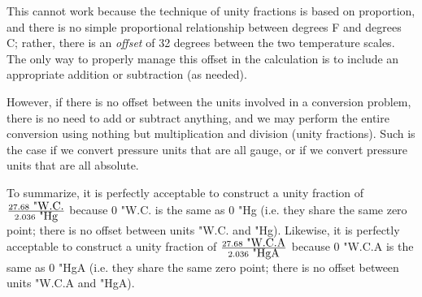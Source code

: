 This cannot work because the technique of unity fractions is based on proportion, and there is no simple proportional relationship between degrees F and degrees C; rather, there is an {\it offset} of 32 degrees between the two temperature scales.  The only way to properly manage this offset in the calculation is to include an appropriate addition or subtraction (as needed).

However, if there is no offset between the units involved in a conversion problem, there is no need to add or subtract anything, and we may perform the entire conversion using nothing but multiplication and division (unity fractions).  Such is the case if we convert pressure units that are all gauge, or if we convert pressure units that are all absolute.

\vskip 10pt

To summarize, it is perfectly acceptable to construct a unity fraction of $27.68 \hbox{ "W.C.} \over 2.036 \hbox{ "Hg}$ because 0 "W.C. is the same as 0 "Hg (i.e. they share the same zero point; there is no offset between units "W.C. and "Hg).  Likewise, it is perfectly acceptable to construct a unity fraction of $27.68 \hbox{ "W.C.A} \over 2.036 \hbox{ "HgA}$ because 0 "W.C.A is the same as 0 "HgA (i.e. they share the same zero point; there is no offset between units "W.C.A and "HgA).











